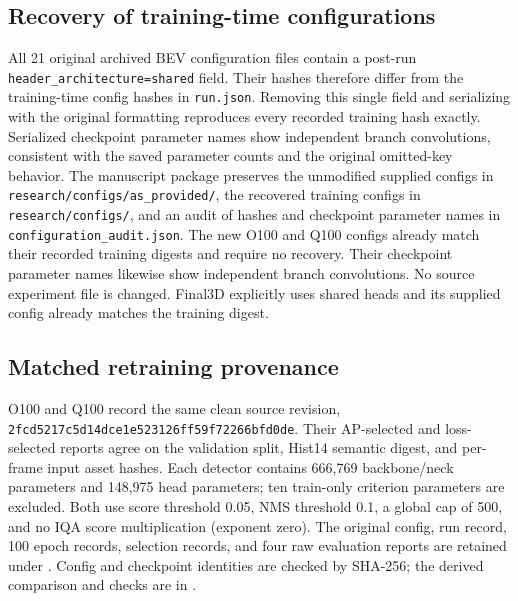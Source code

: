 \documentclass[10pt]{article}
\begin{document}
\subsection*{Recovery of training-time configurations}
All 21 original archived BEV configuration files contain a post-run \texttt{header\_architecture=shared} field. Their hashes therefore differ from the training-time config hashes in \texttt{run.json}. Removing this single field and serializing with the original formatting reproduces every recorded training hash exactly. Serialized checkpoint parameter names show independent branch convolutions, consistent with the saved parameter counts and the original omitted-key behavior. The manuscript package preserves the unmodified supplied configs in \texttt{research/configs/as\_provided/}, the recovered training configs in \texttt{research/configs/}, and an audit of hashes and checkpoint parameter names in \texttt{configuration\_audit.json}. The new O100 and Q100 configs already match their recorded training digests and require no recovery. Their checkpoint parameter names likewise show independent branch convolutions. No source experiment file is changed. Final3D explicitly uses shared heads and its supplied config already matches the training digest.

\subsection*{Matched retraining provenance}
O100 and Q100 record the same clean source revision, \texttt{2fcd5217c5d14dce1e523126ff59f72266bfd0de}. Their AP-selected and loss-selected reports agree on the validation split, Hist14 semantic digest, and per-frame input asset hashes. Each detector contains 666,769 backbone/neck parameters and 148,975 head parameters; ten train-only criterion parameters are excluded. Both use score threshold 0.05, NMS threshold 0.1, a global cap of 500, and no IQA score multiplication (exponent zero). The original config, run record, 100 epoch records, selection records, and four raw evaluation reports are retained under . Config and checkpoint identities are checked by SHA-256; the derived comparison and checks are in .
\end{document}
